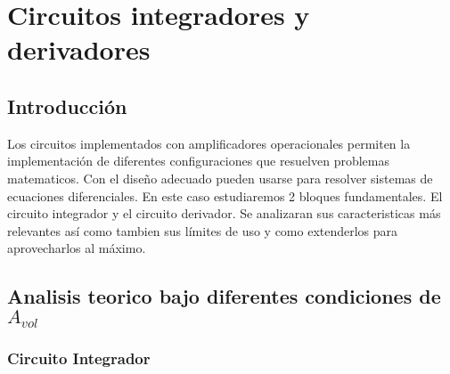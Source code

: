 \documentclass[a4paper]{article}
\begin{document}
\section{Circuitos integradores y derivadores}
\subsection{Introducción}
Los circuitos implementados con amplificadores operacionales permiten la implementación de diferentes configuraciones que resuelven problemas matematicos. Con el diseño adecuado pueden usarse para resolver sistemas de ecuaciones diferenciales.
En este caso estudiaremos 2 bloques fundamentales. El circuito integrador y el circuito derivador. Se analizaran sus caracteristicas más relevantes así como tambien sus límites de uso y como extenderlos para aprovecharlos al máximo.
 
\subsection{Analisis teorico bajo diferentes condiciones de $A_{vol}$}
\subsubsection{Circuito Integrador}
\end{document}
